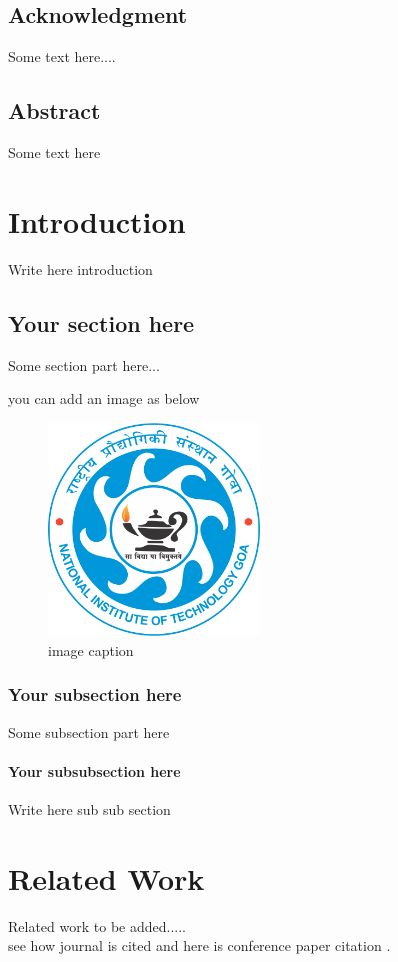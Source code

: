\documentclass[a4paper,12pt]{report}
\begin{document}
\section*{\centering Acknowledgment}
Some text here....
\pagebreak

\section*{\centering Abstract}
Some text here
\tableofcontents
\listoffigures
\listoftables
\pagebreak
{}
\chapter{Introduction}
Write here introduction
\section{Your section here}
Some section part here...

you can add an image as below
\begin{figure}[h]
\center
 \includegraphics[width=0.5\textwidth]{images/NIT_Goa_Logo.png}
 \caption{image caption}
\end{figure}
\subsection{Your subsection here}
Some subsection part here
\subsubsection{Your subsubsection here}
Write here sub sub section 
\pagebreak

\chapter{Related Work}
Related work to be added.....\\
see how journal is cited \cite{journal1} and here is conference paper citation \cite{conference1}.
\end{document}
